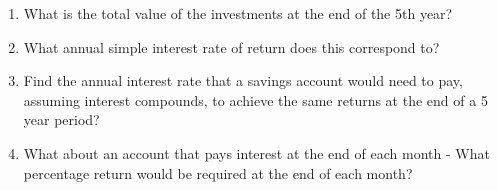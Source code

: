 \documentclass[12pt]{article}
\begin{document}
\begin{enumerate}[label=\textbf{Q\arabic*.}, start=4]
\begin{enumerate}[label=(\alph*)]
    \item What is the total value of the investments at the end of the 5th year?
    \item What annual simple interest rate of return does this correspond to? 
    \item Find the annual interest rate that a savings account would need to pay, assuming interest compounds, to achieve the same returns at the end of a 5 year period?
    \item What about an account that pays interest at the end of each month - What percentage return would be required at the end of each month?
    
\end{enumerate}

\end{enumerate}

\end{document}
